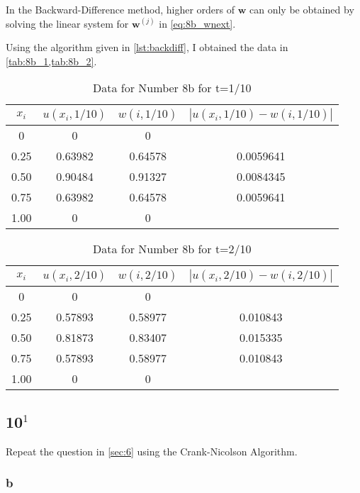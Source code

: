 \documentclass[12pt]{article}
\begin{document}
In the Backward-Difference method, higher orders of $\mathbf{w}$ can
only be obtained by solving the linear system for $\mathbf{w}^{(j)}$
in \cref{eq:8b_wnext}.

Using the algorithm given in \cref{lst:backdiff}, I obtained the data
in \cref{tab:8b_1,tab:8b_2}.

\begin{table}[H]
  \centering
  \begin{tabular}[p]{cccc}
    \hline
    $x_i$ & $u(x_i,1/10)$ & $w(i,1/10)$ & $|u(x_i,1/10)-w(i,1/10)|$ \\
    \hline
    0 & 0 & 0 & \\
    0.25 & 0.63982 & 0.64578 & 0.0059641 \\
    0.50 & 0.90484 & 0.91327 & 0.0084345 \\
    0.75 & 0.63982 & 0.64578 & 0.0059641 \\
    1.00 & 0 & 0 & \\
    \hline
  \end{tabular}
  \caption{Data for Number 8b for t=1/10}
  \label{tab:8b_1}
\end{table}

\begin{table}[H]
  \centering
  \begin{tabular}[p]{cccc}
    \hline
    $x_i$ & $u(x_i,2/10)$ & $w(i,2/10)$ & $|u(x_i,2/10)-w(i,2/10)|$ \\
    \hline
    0 & 0 & 0 & \\
    0.25 & 0.57893 & 0.58977 & 0.010843 \\
    0.50 & 0.81873 & 0.83407 & 0.015335 \\
    0.75 & 0.57893 & 0.58977 & 0.010843 \\
    1.00 & 0 & 0 & \\
    \hline
  \end{tabular}
  \caption{Data for Number 8b for t=2/10}
  \label{tab:8b_2}
\end{table}


\subsection{10$^1$}
Repeat the question in \cref{sec:6} using the Crank-Nicolson Algorithm.
\subsubsection{b}
\end{document}
